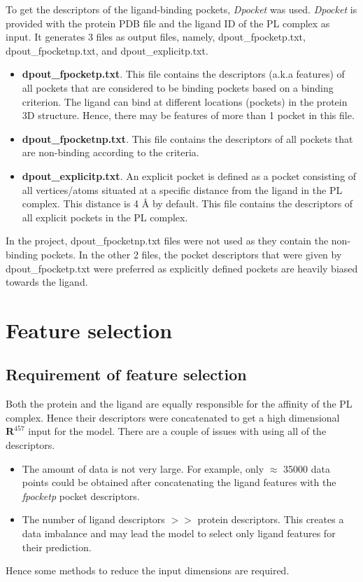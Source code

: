 \documentclass[11pt]{article}
\begin{document}
To get the descriptors of the ligand-binding pockets,  \textit{Dpocket} was used.
\textit{Dpocket} is provided with the protein PDB file and the ligand ID of the PL complex as input.
It generates 3 files as output files,  namely,  dpout\_fpocketp.txt, dpout\_fpocketnp.txt,  and  dpout\_explicitp.txt.
\begin{itemize}
\item \textbf{dpout\_fpocketp.txt}.
This file contains the descriptors (a.k.a features) of all pockets that are considered to be binding pockets based on a binding criterion.
The ligand can bind at different locations (pockets) in the protein 3D structure.
Hence,  there may be features of more than 1 pocket in this file.
\item \textbf{dpout\_fpocketnp.txt}.  This file contains the descriptors of all pockets that are non-binding according to the criteria.
\item \textbf{dpout\_explicitp.txt}.  An explicit pocket is defined as a pocket consisting of all vertices/atoms situated at a specific distance from the ligand in the PL complex.
This distance is 4 \r{A} by default.
This file contains the descriptors of all explicit pockets in the PL complex. 
\end{itemize}

In the project,  dpout\_fpocketnp.txt files were not used as they contain the non-binding pockets.
In the other 2 files,  the pocket descriptors that were given by dpout\_fpocketp.txt were preferred as explicitly defined pockets are heavily biased towards the ligand.

\section{Feature selection}
\subsection{Requirement of feature selection}
Both the protein and the ligand are equally responsible for the affinity of the PL complex.
Hence their descriptors were concatenated to get a high dimensional $\mathbf{R}^{457}$ input for the model.
There are a couple of issues with using all of the descriptors.
\begin{itemize}
\item The amount of data is not very large. 
For example,  only $\approx$ 35000 data points could be obtained after concatenating the ligand features with the \textit{fpocketp} pocket descriptors.
\item The number of ligand descriptors $>>$ protein descriptors.
This creates a data imbalance and may lead the model to select only ligand features for their prediction.
\end{itemize}
Hence some methods to reduce the input dimensions are required.
\end{document}
